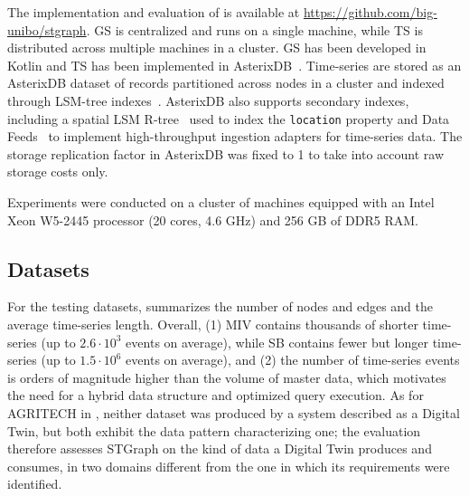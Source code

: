 The implementation and evaluation of \ourapproach is available at \url{https://github.com/big-unibo/stgraph}.
GS is centralized and runs on a single machine, while TS is distributed across multiple machines in a cluster.
GS has been developed in Kotlin and TS has been implemented in AsterixDB~\cite{DBLP:journals/pvldb/AlsubaieeAABBBCCCFGGHKLLOOPTVWW14}.
Time-series are stored as an AsterixDB dataset of records partitioned across nodes in a cluster and indexed through LSM-tree indexes~\cite{DBLP:journals/pvldb/AlsubaieeBBHKCDL14}.
AsterixDB also supports secondary indexes, including a spatial LSM R-tree~\cite{DBLP:journals/pvldb/AlsubaieeBBHKCDL14} used to index the \texttt{location} property and Data Feeds~\cite{DBLP:conf/edbt/GroverC15} to implement high-throughput ingestion adapters for time-series data.
%
%
%
The storage replication factor in AsterixDB was fixed to 1 to take into account raw storage costs only.

Experiments were conducted on a cluster of machines equipped with an Intel Xeon W5-2445 processor (20 cores, 4.6 GHz) and 256 GB of DDR5 RAM.

\subsection{Datasets}
\label{sec:stgraph-datasets}

For the testing datasets,  summarizes the number of nodes and edges and the average time-series length. 
Overall, (1) \textsf{MIV} contains thousands of shorter time-series (up to $2.6 \cdot 10^3$ events on average), while \textsf{SB} contains fewer but longer time-series (up to $1.5\cdot10^6$ events on average), and (2) the number of time-series events is orders of magnitude higher than the volume of master data, which motivates the need for a hybrid data structure and optimized query execution.
As for AGRITECH in , neither dataset was produced by a system described as a Digital Twin, but both exhibit the data pattern characterizing one; the evaluation therefore assesses STGraph on the kind of data a Digital Twin produces and consumes, in two domains different from the one in which its requirements were identified.

